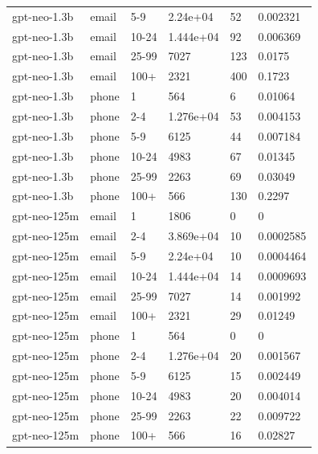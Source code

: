 \begin{tabular}{llllll}
gpt-neo-1.3b & email & 5-9 & 2.24e+04 & 52 & 0.002321 \\
gpt-neo-1.3b & email & 10-24 & 1.444e+04 & 92 & 0.006369 \\
gpt-neo-1.3b & email & 25-99 & 7027 & 123 & 0.0175 \\
gpt-neo-1.3b & email & 100+ & 2321 & 400 & 0.1723 \\
gpt-neo-1.3b & phone & 1 & 564 & 6 & 0.01064 \\
gpt-neo-1.3b & phone & 2-4 & 1.276e+04 & 53 & 0.004153 \\
gpt-neo-1.3b & phone & 5-9 & 6125 & 44 & 0.007184 \\
gpt-neo-1.3b & phone & 10-24 & 4983 & 67 & 0.01345 \\
gpt-neo-1.3b & phone & 25-99 & 2263 & 69 & 0.03049 \\
gpt-neo-1.3b & phone & 100+ & 566 & 130 & 0.2297 \\
gpt-neo-125m & email & 1 & 1806 & 0 & 0 \\
gpt-neo-125m & email & 2-4 & 3.869e+04 & 10 & 0.0002585 \\
gpt-neo-125m & email & 5-9 & 2.24e+04 & 10 & 0.0004464 \\
gpt-neo-125m & email & 10-24 & 1.444e+04 & 14 & 0.0009693 \\
gpt-neo-125m & email & 25-99 & 7027 & 14 & 0.001992 \\
gpt-neo-125m & email & 100+ & 2321 & 29 & 0.01249 \\
gpt-neo-125m & phone & 1 & 564 & 0 & 0 \\
gpt-neo-125m & phone & 2-4 & 1.276e+04 & 20 & 0.001567 \\
gpt-neo-125m & phone & 5-9 & 6125 & 15 & 0.002449 \\
gpt-neo-125m & phone & 10-24 & 4983 & 20 & 0.004014 \\
gpt-neo-125m & phone & 25-99 & 2263 & 22 & 0.009722 \\
gpt-neo-125m & phone & 100+ & 566 & 16 & 0.02827 \\
\bottomrule
\end{tabular}
